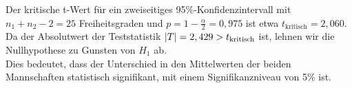 \documentclass[main.tex]{subfiles}
\begin{document}
Der kritische t-Wert für ein zweiseitiges 95\%-Konfidenzintervall mit $n_1+n_2 - 2 = 25$ Freiheitsgraden und $p=1-\frac{\alpha}{2} = 0,975$ ist etwa $t_{\text{kritisch}} = 2,060$.\\

Da der Absolutwert der Teststatistik $\lvert T\rvert = 2,429 > t_{\text{kritisch}}$ ist, lehnen wir die Nullhypothese zu Gunsten von $H_1$ ab.\\

Dies bedeutet, dass der Unterschied in den Mittelwerten der beiden Mannschaften statistisch signifikant, mit einem Signifikanzniveau von 5\% ist.
\end{document}
